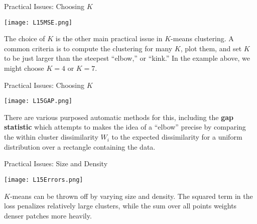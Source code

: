 \documentclass[10pt, table, dvipsnames,xcdraw,handout]{beamer}
\begin{document}
\begin{frame}[fragile]{Practical Issues: Choosing $K$}
  \begin{minipage}[t][0.5\textheight][t]{\textwidth}
	\centering \texttt{[image: L15MSE.png]} 
  \end{minipage}
  \vfill
\begin{minipage}[t][0.5\textheight][t]{\textwidth}
The choice of $K$ is the other main practical issue in $K$-means clustering. A common criteria is to compute the clustering for many $K$, plot them, and set $K$ to be just larger than the steepest ``elbow,'' or ``kink.'' \pause In the example above, we might choose $K = 4$ or $K = 7$.
\end{minipage}

\end{frame}


\begin{frame}[fragile]{Practical Issues: Choosing $K$}
  \begin{minipage}[t][0.5\textheight][t]{\textwidth}
	\centering \texttt{[image: L15GAP.png]} 
  \end{minipage}
  \vfill
\begin{minipage}[t][0.5\textheight][t]{\textwidth}
There are various purposed automatic methods for this, including the \textbf{gap statistic} which attempts to makes the idea of a ``elbow'' precise by comparing the within cluster dissimilarity $W_i$ to the expected dissimilarity for a uniform distribution over a rectangle containing the data. 
\end{minipage}

\end{frame}




\begin{frame}[fragile]{Practical Issues: Size and Density}
  \begin{minipage}[t][0.5\textheight][t]{\textwidth}
	\centering \texttt{[image: L15Errors.png]} 
  \end{minipage}
  \vfill
\begin{minipage}[t][0.5\textheight][t]{\textwidth}
$K$-means can be thrown off by varying size and density. The squared term in the loss penalizes relatively large clusters, while the sum over all points weights denser patches more heavily. 
\end{minipage}

\end{frame}
\end{document}
